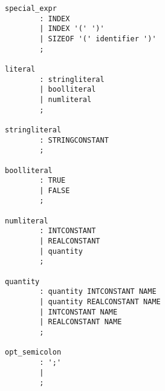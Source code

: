 \begin{Verbatim}[commandchars=\\\{\}]
special_expr
        : INDEX
        | INDEX '(' ')'
        | SIZEOF '(' identifier ')'
        ;

literal
        : stringliteral
        | boolliteral
        | numliteral
        ;

stringliteral
        : STRINGCONSTANT
        ;

boolliteral
        : TRUE
        | FALSE
        ;

numliteral
        : INTCONSTANT
        | REALCONSTANT
        | quantity
        ;

quantity
        : quantity INTCONSTANT NAME
        | quantity REALCONSTANT NAME
        | INTCONSTANT NAME
        | REALCONSTANT NAME
        ;

opt_semicolon
        : ';'
        |
        ;

\end{Verbatim}


